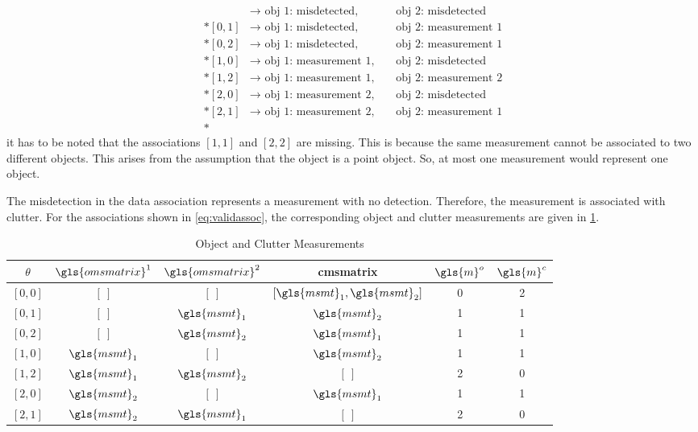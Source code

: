 \documentclass[a4paper]{article}
\begin{document}
\begin{align}
	[0,0]&\to\text{ obj 1: misdetected, }&&\text{obj 2: misdetected}\label{eq:validassoc}\\*
	[0,1]&\to\text{ obj 1: misdetected, }&&\text{obj 2: measurement 1}\nonumber\\*
	[0,2]&\to\text{ obj 1: misdetected, }&&\text{obj 2: measurement 1}\nonumber\\*
	[1,0]&\to\text{ obj 1: measurement 1, }&&\text{obj 2: misdetected}\nonumber\\*
	[1,2]&\to\text{ obj 1: measurement 1, }&&\text{obj 2: measurement 2}\nonumber\\*
	[2,0]&\to\text{ obj 1: measurement 2, }&&\text{obj 2: misdetected}\nonumber\\*
	[2,1]&\to\text{ obj 1: measurement 2, }&&\text{obj 2: measurement 1}\nonumber\\*
\end{align}
it has to be noted that the associations $[1,1]$ and $[2,2]$ are missing. This is because the same measurement cannot be associated to two different objects. This arises from the assumption that the object is a point object. So, at most one measurement would represent one object.\par
The misdetection in the data association represents a measurement with no detection. Therefore, the measurement is associated with clutter. For the associations shown in \cref{eq:validassoc}, the corresponding object and clutter measurements are given in \cref{tab:assoctable}.
\begin{table}[h]
	\centering
	\begin{tabular}{cccccc}
		$\theta$ & $\gls{omsmatrix}^1$ & $\gls{omsmatrix}^2$ & \gls{cmsmatrix} & $\gls{m}^o$ & $\gls{m}^c$ \\\hline
		$\left[0,0\right]$ & $[~]$ 			& $[~]$ 		& $[\gls{msmt}_1,\gls{msmt}_2]$ & 0 & 2 \\
		$\left[0,1\right]$ & $[~]$ 			&$\gls{msmt}_1$ & $\gls{msmt}_2$ 				  & 1 & 1 \\
		$\left[0,2\right]$ & $[~]$ 			&$\gls{msmt}_2$ & $\gls{msmt}_1$ 				  & 1 & 1 \\
		$\left[1,0\right]$ & $\gls{msmt}_1$	&$[~]$ & $\gls{msmt}_2$ 				  & 1 & 1 \\
		$\left[1,2\right]$ & $\gls{msmt}_1$	&$\gls{msmt}_2$ & $[~]$ 						  & 2 & 0 \\
		$\left[2,0\right]$ & $\gls{msmt}_2$	&$[~]$ & $\gls{msmt}_1$ 				  & 1 & 1 \\
		$\left[2,1\right]$ & $\gls{msmt}_2$ & $\gls{msmt}_1$ & $[~]$ 						  & 2 & 0
	\end{tabular}	
	\caption{Object and Clutter Measurements}
	\label{tab:assoctable}
\end{table}
\end{document}
